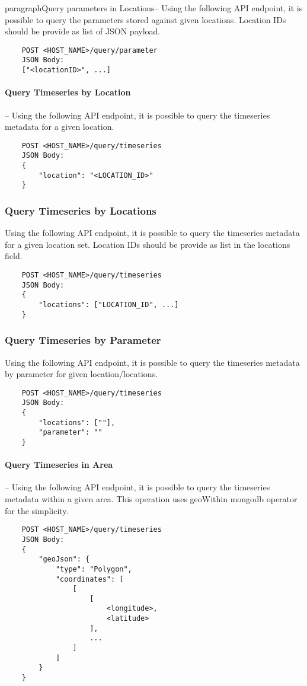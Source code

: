 paragraph{Query parameters in Locations}-- Using the following API endpoint, it is possible to query the parameters stored against given locations. Location IDs should be provide as list of JSON payload.
\begin{lstlisting}
    POST <HOST_NAME>/query/parameter
    JSON Body:
    ["<locationID>", ...]
\end{lstlisting}

\paragraph{Query Timeseries by Location}-- Using the following API endpoint, it is possible to query the timeseries metadata for a given location.
\begin{lstlisting}
    POST <HOST_NAME>/query/timeseries
    JSON Body:
    {
        "location": "<LOCATION_ID>"
    }
\end{lstlisting}

\subsubsection{Query Timeseries by Locations}
Using the following API endpoint, it is possible to query the timeseries metadata for a given location set. Location IDs should be provide as list in the locations field.
\begin{lstlisting}
    POST <HOST_NAME>/query/timeseries
    JSON Body:
    {
        "locations": ["LOCATION_ID", ...]
    }
\end{lstlisting}

\subsubsection{Query Timeseries by Parameter}
Using the following API endpoint, it is possible to query the timeseries metadata by parameter for given location/locations.
\begin{lstlisting}
    POST <HOST_NAME>/query/timeseries
    JSON Body:
    {
        "locations": [""],
        "parameter": ""
    }
\end{lstlisting}

\paragraph{Query Timeseries in Area} -- Using the following API endpoint, it is possible to query the timeseries metadata within a given area. This operation uses geoWithin \acrshort{mongodb} operator for the simplicity.
\begin{lstlisting}
    POST <HOST_NAME>/query/timeseries
    JSON Body:
    {
        "geoJson": {
            "type": "Polygon",
            "coordinates": [
                [
                    [
                        <longitude>,
                        <latitude>
                    ],
                    ...
                ]
            ]
        }
    }
\end{lstlisting}

